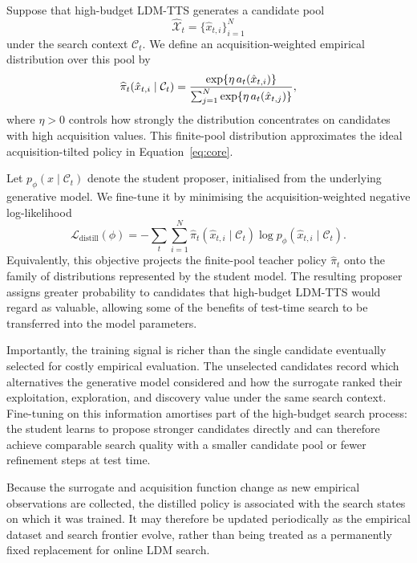 Suppose that high-budget LDM-TTS generates a candidate pool
\[
    \widehat{\mathcal{X}}_t
    =
    \{\hat{x}_{t,i}\}_{i=1}^{N}
\]
under the search context $\mathcal{C}_t$. We define an acquisition-weighted
empirical distribution over this pool by
\begin{equation}
\label{eq:empirical-tilt}
    \widehat{\pi}_t(\hat{x}_{t,i}\mid\mathcal{C}_t)
    =
    \frac{
        \exp\!\left\{\eta\,a_t(\hat{x}_{t,i})\right\}
    }{
        \sum_{j=1}^{N}
        \exp\!\left\{\eta\,a_t(\hat{x}_{t,j})\right\}
    },
\end{equation}
where $\eta>0$ controls how strongly the distribution concentrates on
candidates with high acquisition values. This finite-pool distribution
approximates the ideal acquisition-tilted policy in
Equation~\eqref{eq:core}.

Let $p_{\phi}(x\mid\mathcal{C}_t)$ denote the student proposer, initialised
from the underlying generative model. We fine-tune it by minimising the
acquisition-weighted negative log-likelihood
\begin{equation}
\label{eq:acquisition-distillation}
    \mathcal{L}_{\mathrm{distill}}(\phi)
    =
    -
    \sum_t
    \sum_{i=1}^{N}
    \widehat{\pi}_t(\hat{x}_{t,i}\mid\mathcal{C}_t)
    \log p_{\phi}(\hat{x}_{t,i}\mid\mathcal{C}_t).
\end{equation}
Equivalently, this objective projects the finite-pool teacher policy
$\widehat{\pi}_t$ onto the family of distributions represented by the student
model. The resulting proposer assigns greater probability to candidates that
high-budget LDM-TTS would regard as valuable, allowing some of the benefits of
test-time search to be transferred into the model parameters.

Importantly, the training signal is richer than the single candidate
eventually selected for costly empirical evaluation. The unselected candidates
record which alternatives the generative model considered and how the
surrogate ranked their exploitation, exploration, and discovery value under
the same search context. Fine-tuning on this information amortises part of the
high-budget search process: the student learns to propose stronger candidates
directly and can therefore achieve comparable search quality with a smaller
candidate pool or fewer refinement steps at test time.

Because the surrogate and acquisition function change as new empirical
observations are collected, the distilled policy is associated with the
search states on which it was trained. It may therefore be updated
periodically as the empirical dataset and search frontier evolve, rather than
being treated as a permanently fixed replacement for online LDM search.
%

